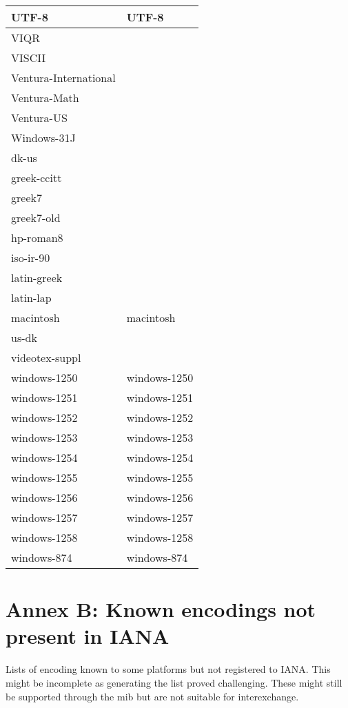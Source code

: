 \documentclass{wg21}
\begin{document}
\begin{longtable}{| p{} | p{} |}
UTF-8 & UTF-8\\ \hline
VIQR & \\ \hline
VISCII & \\ \hline
Ventura-International & \\ \hline
Ventura-Math & \\ \hline
Ventura-US & \\ \hline
Windows-31J & \\ \hline
dk-us & \\ \hline
greek-ccitt & \\ \hline
greek7 & \\ \hline
greek7-old & \\ \hline
hp-roman8 & \\ \hline
iso-ir-90 & \\ \hline
latin-greek & \\ \hline
latin-lap & \\ \hline
macintosh & macintosh\\ \hline
us-dk & \\ \hline
videotex-suppl & \\ \hline
windows-1250 & windows-1250\\ \hline
windows-1251 & windows-1251\\ \hline
windows-1252 & windows-1252\\ \hline
windows-1253 & windows-1253\\ \hline
windows-1254 & windows-1254\\ \hline
windows-1255 & windows-1255\\ \hline
windows-1256 & windows-1256\\ \hline
windows-1257 & windows-1257\\ \hline
windows-1258 & windows-1258\\ \hline
windows-874 & windows-874\\ \hline
\end{longtable}

\section{Annex B: Known encodings not present in IANA}

Lists of encoding known to some platforms but not registered to IANA.
This might be incomplete as generating the list proved challenging.
These might still be supported through the  mib but are not
suitable for interexchange.
\end{document}
